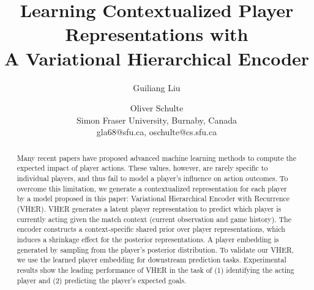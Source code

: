 \documentclass[letterpaper]{article} %
\title{Learning Contextualized Player Representations with \\ A Variational Hierarchical Encoder}
\author{
Guiliang Liu \and
Oliver Schulte \\
Simon Fraser University, Burnaby, Canada\\
gla68@sfu.ca,
oschulte@cs.sfu.ca
}
\begin{document}
\maketitle


\begin{abstract}
Many recent papers have proposed advanced machine learning methods to compute the expected impact of player actions. These values, however, are rarely specific to individual players, and thus fail to model a player's influence on action outcomes. To overcome this limitation, we generate a contextualized representation for each player by a model proposed in this paper: Variational Hierarchical Encoder with Recurrence (VHER). VHER generates a latent player representation to predict which player is currently acting given the match context (current observation and game history). The encoder constructs a context-specific shared prior over player representations, which induces a shrinkage effect for the posterior representations. A player embedding is generated by sampling from the player's posterior distribution. To validate our VHER, we use the learned player embedding for downstream prediction tasks.  Experimental results show the leading performance of VHER in the task of (1) identifying the acting player and (2) predicting the player's expected goals.
\end{abstract}

\end{document}

